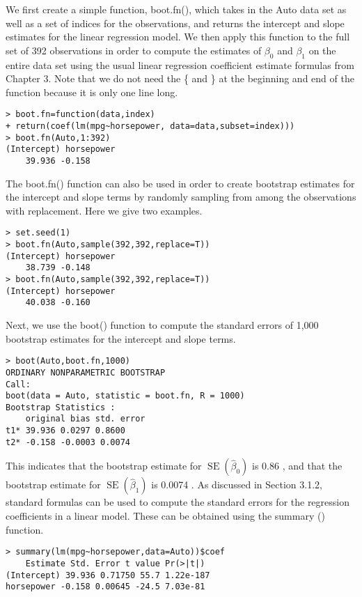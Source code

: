 \documentclass[10pt]{article}
\begin{document}
We first create a simple function, boot.fn(), which takes in the Auto data set as well as a set of indices for the observations, and returns the intercept and slope estimates for the linear regression model. We then apply this function to the full set of 392 observations in order to compute the estimates of $\beta_{0}$ and $\beta_{1}$ on the entire data set using the usual linear regression coefficient estimate formulas from Chapter 3. Note that we do not need the \{ and \} at the beginning and end of the function because it is only one line long.

\begin{verbatim}
> boot.fn=function(data,index)
+ return(coef(lm(mpg~horsepower, data=data,subset=index)))
> boot.fn(Auto,1:392)
(Intercept) horsepower
    39.936 -0.158
\end{verbatim}

The boot.fn() function can also be used in order to create bootstrap estimates for the intercept and slope terms by randomly sampling from among the observations with replacement. Here we give two examples.

\begin{verbatim}
> set.seed(1)
> boot.fn(Auto,sample(392,392,replace=T))
(Intercept) horsepower
    38.739 -0.148
> boot.fn(Auto,sample(392,392,replace=T))
(Intercept) horsepower
    40.038 -0.160
\end{verbatim}

Next, we use the boot() function to compute the standard errors of 1,000 bootstrap estimates for the intercept and slope terms.

\begin{verbatim}
> boot(Auto,boot.fn,1000)
ORDINARY NONPARAMETRIC BOOTSTRAP
Call:
boot(data = Auto, statistic = boot.fn, R = 1000)
Bootstrap Statistics :
    original bias std. error
t1* 39.936 0.0297 0.8600
t2* -0.158 -0.0003 0.0074
\end{verbatim}

This indicates that the bootstrap estimate for $\operatorname{SE}\left(\hat{\beta}_{0}\right)$ is 0.86 , and that the bootstrap estimate for $\operatorname{SE}\left(\hat{\beta}_{1}\right)$ is 0.0074 . As discussed in Section 3.1.2, standard formulas can be used to compute the standard errors for the regression coefficients in a linear model. These can be obtained using the summary () function.

\begin{verbatim}
> summary(lm(mpg~horsepower,data=Auto))$coef
    Estimate Std. Error t value Pr(>|t|)
(Intercept) 39.936 0.71750 55.7 1.22e-187
horsepower -0.158 0.00645 -24.5 7.03e-81
\end{verbatim}
\end{document}
